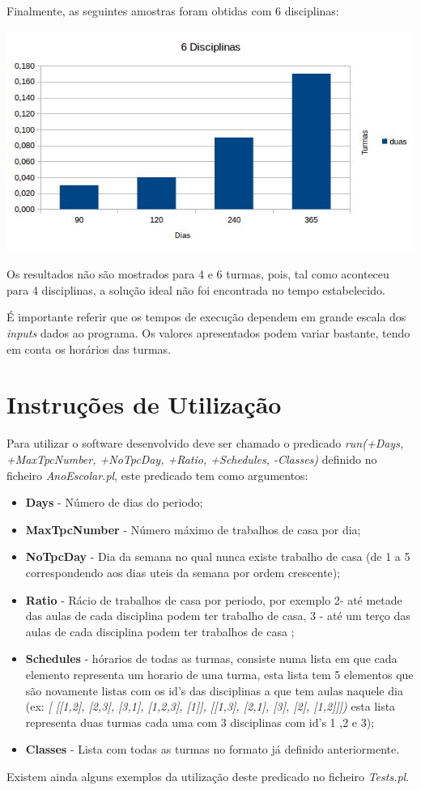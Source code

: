 \documentclass{llncs}
\begin{document}
\newpage
Finalmente, as seguintes amostras foram obtidas com 6 disciplinas:

\includegraphics[scale=0.85]{images/chart3.jpg}

Os resultados não são mostrados para 4 e 6 turmas, pois, tal como aconteceu para 4 disciplinas, a solução ideal não foi encontrada no tempo estabelecido.\par

É importante referir que os tempos de execução dependem em grande escala dos \textit{inputs} dados ao programa. Os valores apresentados podem variar bastante, tendo em conta os horários das turmas.

\section{Instruções de Utilização}

Para utilizar o software desenvolvido deve ser chamado o predicado  \textit{run(+Days, +MaxTpcNumber, +NoTpcDay, +Ratio, +Schedules, -Classes)} definido no ficheiro \textit{AnoEscolar.pl}, este predicado tem como argumentos:
	\begin{itemize}
			\item \textbf{Days} - Número de dias do periodo;
			\item \textbf{MaxTpcNumber} - Número máximo de trabalhos de casa por dia;
			\item \textbf{NoTpcDay} - Dia da semana no qual nunca existe trabalho de casa (de 1 a 5 correspondendo aos dias uteis da semana por ordem crescente);
			\item \textbf{Ratio} - Rácio de trabalhos de casa por periodo, por exemplo 2- até metade das aulas de cada disciplina podem ter trabalho de casa, 3 - até um terço das aulas de cada disciplina podem ter trabalhos de casa ;
			\item \textbf{Schedules} - hórarios de todas as turmas, consiste numa lista em que cada elemento representa um horario de uma turma, esta lista tem 5 elementos que são novamente listas com os id's das disciplinas a que tem aulas naquele dia (ex:  \textit{[
            [[1,2], [2,3], [3,1], [1,2,3], [1]], [[1,3], [2,1], [3], [2], [1,2]]])} esta lista representa duas turmas cada uma com 3 disciplinas com id's 1 ,2 e 3); 
			\item \textbf{Classes} - Lista com todas as turmas no formato já definido anteriormente.
	\end{itemize}
Existem ainda alguns exemplos da utilização deste predicado no ficheiro \textit{Tests.pl}.
\end{document}
